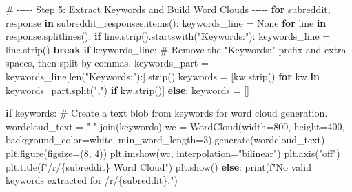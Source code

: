 \documentclass[
  12pt,
  letterpaper,
  DIV=11,
  numbers=noendperiod,
  abstract]{scrartcl}
\newenvironment{Shaded}{\begin{snugshade}}{\end{snugshade}}
\newcommand{\BuiltInTok}[1]{\textcolor[rgb]{0.00,0.23,0.31}{#1}}
\newcommand{\CommentTok}[1]{\textcolor[rgb]{0.37,0.37,0.37}{#1}}
\newcommand{\ControlFlowTok}[1]{\textcolor[rgb]{0.00,0.23,0.31}{\textbf{#1}}}
\newcommand{\DecValTok}[1]{\textcolor[rgb]{0.68,0.00,0.00}{#1}}
\newcommand{\KeywordTok}[1]{\textcolor[rgb]{0.00,0.23,0.31}{\textbf{#1}}}
\newcommand{\NormalTok}[1]{\textcolor[rgb]{0.00,0.23,0.31}{#1}}
\newcommand{\OperatorTok}[1]{\textcolor[rgb]{0.37,0.37,0.37}{#1}}
\newcommand{\SpecialCharTok}[1]{\textcolor[rgb]{0.37,0.37,0.37}{#1}}
\newcommand{\SpecialStringTok}[1]{\textcolor[rgb]{0.13,0.47,0.30}{#1}}
\newcommand{\StringTok}[1]{\textcolor[rgb]{0.13,0.47,0.30}{#1}}
\newcommand{\VariableTok}[1]{\textcolor[rgb]{0.07,0.07,0.07}{#1}}
\begin{document}
\begin{Shaded}
\begin{Highlighting}[]
\CommentTok{\# {-}{-}{-}{-}{-} Step 5: Extract Keywords and Build Word Clouds {-}{-}{-}{-}{-}}
\ControlFlowTok{for}\NormalTok{ subreddit, response }\KeywordTok{in}\NormalTok{ subreddit\_responses.items():}
\NormalTok{    keywords\_line }\OperatorTok{=} \VariableTok{None}
    \ControlFlowTok{for}\NormalTok{ line }\KeywordTok{in}\NormalTok{ response.splitlines():}
        \ControlFlowTok{if}\NormalTok{ line.strip().startswith(}\StringTok{"Keywords:"}\NormalTok{):}
\NormalTok{            keywords\_line }\OperatorTok{=}\NormalTok{ line.strip()}
            \ControlFlowTok{break}
    \ControlFlowTok{if}\NormalTok{ keywords\_line:}
        \CommentTok{\# Remove the "Keywords:" prefix and extra spaces, then split by commas.}
\NormalTok{        keywords\_part }\OperatorTok{=}\NormalTok{ keywords\_line[}\BuiltInTok{len}\NormalTok{(}\StringTok{"Keywords:"}\NormalTok{):].strip()}
\NormalTok{        keywords }\OperatorTok{=}\NormalTok{ [kw.strip() }\ControlFlowTok{for}\NormalTok{ kw }\KeywordTok{in}\NormalTok{ keywords\_part.split(}\StringTok{","}\NormalTok{) }\ControlFlowTok{if}\NormalTok{ kw.strip()]}
    \ControlFlowTok{else}\NormalTok{:}
\NormalTok{        keywords }\OperatorTok{=}\NormalTok{ []}
    
    \ControlFlowTok{if}\NormalTok{ keywords:}
        \CommentTok{\# Create a text blob from keywords for word cloud generation.}
\NormalTok{        wordcloud\_text }\OperatorTok{=} \StringTok{" "}\NormalTok{.join(keywords)}
\NormalTok{        wc }\OperatorTok{=}\NormalTok{ WordCloud(width}\OperatorTok{=}\DecValTok{800}\NormalTok{, height}\OperatorTok{=}\DecValTok{400}\NormalTok{, background\_color}\OperatorTok{=}\StringTok{\textquotesingle{}white\textquotesingle{}}\NormalTok{, min\_word\_length}\OperatorTok{=}\DecValTok{3}\NormalTok{).generate(wordcloud\_text)}
\NormalTok{        plt.figure(figsize}\OperatorTok{=}\NormalTok{(}\DecValTok{8}\NormalTok{, }\DecValTok{4}\NormalTok{))}
\NormalTok{        plt.imshow(wc, interpolation}\OperatorTok{=}\StringTok{"bilinear"}\NormalTok{)}
\NormalTok{        plt.axis(}\StringTok{"off"}\NormalTok{)}
\NormalTok{        plt.title(}\SpecialStringTok{f"/r/}\SpecialCharTok{\{}\NormalTok{subreddit}\SpecialCharTok{\}}\SpecialStringTok{ Word Cloud"}\NormalTok{)}
\NormalTok{        plt.show()}
    \ControlFlowTok{else}\NormalTok{:}
        \BuiltInTok{print}\NormalTok{(}\SpecialStringTok{f"No valid keywords extracted for /r/}\SpecialCharTok{\{}\NormalTok{subreddit}\SpecialCharTok{\}}\SpecialStringTok{."}\NormalTok{)}
\end{Highlighting}
\end{Shaded}
\end{document}
